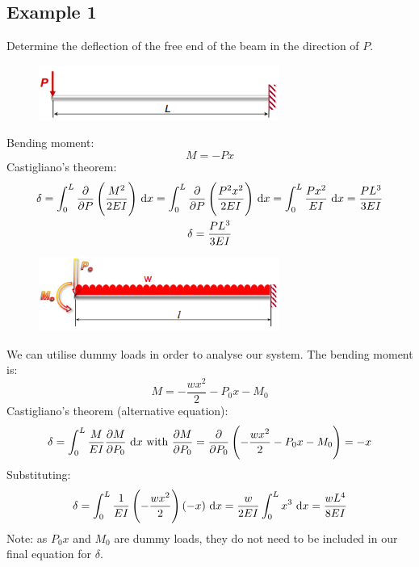 \documentclass[class=report, crop=false, 12pt,a4paper]{standalone}
\begin{document}
\subsection{Example 1}
Determine the deflection of the free end of the beam in the direction of $P$.
\begin{figure}[H]
  \centering
  \includegraphics[width = 0.7\textwidth]{../img/diagram15.png}
  \caption{}
\end{figure}
Bending moment:
\begin{equation}
  M = -P x
\end{equation}
Castigliano's theorem:
\begin{gather}
  \delta = \int_0^L \frac{\partial}{\partial P} \left(\frac{M^2}{2EI}\right) \, \dif x = \int_0^L \frac{\partial }{\partial P} \left(\frac{P^2 x^2}{2EI}\right)\, \dif x = \int_0^L \frac{Px^2}{EI} \, \dif x = \frac{PL^3}{3EI}\\
  \delta = \frac{PL^3}{3EI}
\end{gather}
\begin{figure}[H]
  \centering
  \includegraphics[width = 0.7\textwidth]{../img/diagram16.png}
  \caption{}
\end{figure}
We can utilise dummy loads in order to analyse our system. The bending moment is:
\begin{equation}
  M = - \frac{wx^2}{2} - P_0 x - M_0 
\end{equation}
Castigliano's theorem (alternative equation):
\begin{align}
  \delta = \int_0^L \frac{M}{EI} \frac{\partial M}{\partial P_0} \, \dif x \textrm{ with } \frac{\partial M}{\partial P_0} = \frac{\partial }{\partial P_0} \left(-\frac{wx^2}{2} - P_0 x - M_0\right) = -x
\end{align}
Substituting:
\begin{align}
  \delta = \int_0^L \frac{1}{EI} \left(-\frac{wx^2}{2}\right)\left(-x\right)\, \dif x = \frac{w}{2EI} \int_0^L x^3 \, \dif x = \frac{wL^4}{8EI}
\end{align}
Note: as $P_0 x$ and $M_0$ are dummy loads, they do not need to be included in our final equation for $\delta$.
\end{document}
